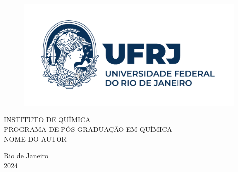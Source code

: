 \documentclass[
	12pt,				%
	openright,			%
	oneside,			%
	a4paper,			%
	chapter=TITLE,		%
	section=TITLE,		%
	sumario=abnt-6027-2012,
	english,			%
	french,				%
	spanish,			%
	brazil				%
	]{abntex2}
\begin{document}

\frenchspacing 



\renewcommand{\imprimircapa}{
	\begin{capa}
		\center
		\begin{figure}
			\centering
			\includegraphics[scale=0.65]{capitulos/figuras/ufrj-horizontal-cor-cmyk-completa-impressao}
			\label{minerva}
		\end{figure}
		
		
		\large INSTITUTO DE QUÍMICA \\ PROGRAMA DE PÓS-GRADUAÇÃO EM QUÍMICA \\NOME DO AUTOR
		
		\vfill
		\begin{center}
			\bfseries\LARGE\imprimirtitulo
		\end{center}
		\vfill
		
		Rio de Janeiro \\%
		2024 %
		
		\vspace*{1cm}
	\end{capa}
}

\imprimircapa

\imprimirfolhaderosto*

\end{document}
